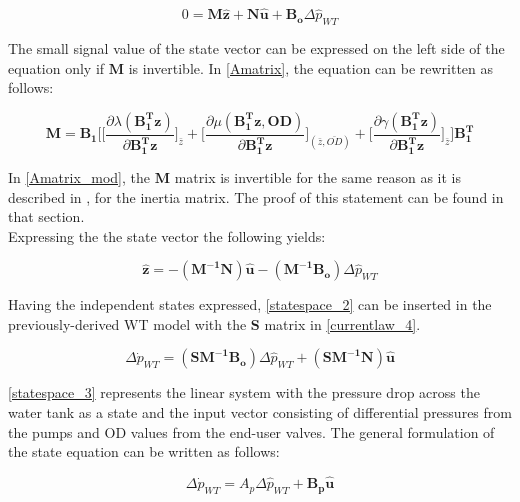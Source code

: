 \begin{equation}
 0 = \pmb{M} \pmb{\hat{z}} + \pmb{N} \pmb{\hat{u}} + \pmb{B_o} \Delta \hat{p}_{WT}    
 \label{statespace_2}
\end{equation}

The small signal value of the state vector can be expressed on the left side of the equation only if $\pmb{M}$ is invertible. In \eqref{Amatrix}, the equation can be rewritten as follows: 

\begin{equation}
  \pmb{M} = \pmb{B_1}\Bigg[ \bigg[ \frac{\partial{\lambda(\pmb{{B_1^{T}}}\pmb{z})}}{{\partial{\pmb{{B_1^{T}}}\pmb{z}}}}   \bigg]_{\bar{z}} +
\bigg[ \frac{\partial{\mu(\pmb{{B_1^{T}}}\pmb{z}, \pmb{OD})}}{{\partial{\pmb{{B_1^{T}}}\pmb{z}}}}  \bigg]_{(\bar{z}, \bar{OD})} +  \bigg[ \frac{\partial{\gamma(\pmb{{B_1^{T}}}\pmb{z})}}{{\partial{\pmb{{B_1^{T}}}\pmb{z}}}}   \bigg]_{\bar{z}}\Bigg] \pmb{{B_1^{T}}}
\label{Amatrix_mod}
\end{equation}

In \eqref{Amatrix_mod}, the $\pmb{M}$ matrix is invertible for the same reason as it is described in , for the inertia matrix. The proof of this statement can be found in that section. 
\\
Expressing the the state vector the following yields:

\begin{equation}
 \pmb{\hat{z}} = -(\pmb{M^{-1}}\pmb{N})\pmb{\hat{u}} - (\pmb{M^{-1}}\pmb{B_o})\Delta \hat{p}_{WT}    
 \label{statespace_2}
\end{equation}

Having the independent states expressed, \eqref{statespace_2} can be inserted in the previously-derived WT model with the $\pmb{S}$ matrix in \eqref{currentlaw_4}. 

\begin{equation}
\Delta \dot{p}_{WT} = (\pmb{S}\pmb{M^{-1}}\pmb{B_o}) \Delta \hat{p}_{WT}  + (\pmb{S}\pmb{M^{-1}}\pmb{N}) \pmb{\hat{u}} 
\label{statespace_3}
\end{equation}

\eqref{statespace_3} represents the linear system with the pressure drop across the water tank as a state and the input vector consisting of differential pressures from the pumps and OD values from the end-user valves. The general formulation of the state equation can be written as follows:  

\begin{equation}
\Delta \dot{p}_{WT} = A_p \Delta \hat{p}_{WT}  + \pmb{B_p}\pmb{\hat{u}}  
 \label{statespace_4}
\end{equation}

